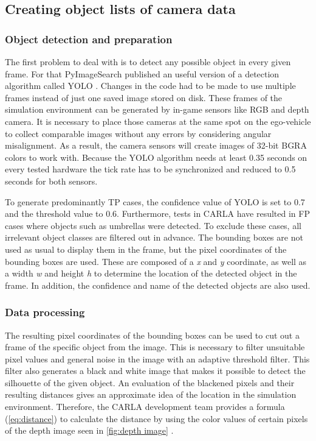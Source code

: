 \subsection{Creating object lists of camera data}\label{C}
\subsubsection{Object detection and preparation}
The first problem to deal with is to detect any possible object in every given frame. For that PyImageSearch published an useful version of a detection algorithm called \ac{YOLO} \cite{Yolo}. 
Changes in the code had to be made to use multiple frames instead of just one saved image stored on disk.
These frames of the simulation environment can be generated by in-game sensors like RGB and depth camera. It is necessary to place those cameras at the same spot on the ego-vehicle to collect comparable images without any errors by considering angular misalignment. As a result, the camera sensors will create images of 32-bit BGRA colors to work with. 
Because the \ac{YOLO} algorithm needs at least 0.35 seconds on every tested hardware the tick rate has to be synchronized and reduced to 0.5 seconds for both sensors.

To generate predominantly \ac{TP} cases, the confidence value of \ac{YOLO} is set to 0.7 and the threshold value to 0.6. Furthermore, tests in CARLA have resulted in \ac{FP} cases where objects such as umbrellas were detected. To exclude these cases, all irrelevant object classes are filtered out in advance. The bounding boxes are not used as usual to display them in the frame, but the pixel coordinates of the bounding boxes are used. These are composed of a \textit{x} and \textit{y} coordinate, as well as a width \textit{w} and height \textit{h} to determine the location of the detected object in the frame. In addition, the confidence and name of the detected objects are also used. 
\subsubsection{Data processing}
The resulting pixel coordinates of the bounding boxes can be used to cut out a frame of the specific object from the image. This is necessary to filter unsuitable pixel values and general noise in the image with an adaptive threshold filter. This filter also generates a black and white image that makes it possible to detect the silhouette of the given object. An evaluation of the blackened pixels and their resulting distances gives an approximate idea of the location in the simulation environment.
Therefore, the CARLA development team provides a formula (\cref{eq:distance}) to calculate the distance by using the color values of certain pixels of the depth image seen in \cref{fig:depth image} \cite{distance}. 

